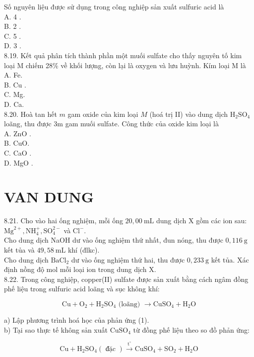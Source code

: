 \documentclass[10pt]{article}
\begin{document}
Số nguyên liệu được sử dụng trong công nghiệp sản xuất sulfuric acid là\\
A. 4 .\\
B. 2 .\\
C. 5 .\\
D. 3 .\\
8.19. Kết quả phân tích thành phần một muối sulfate cho thấy nguyên tố kim loại M chiếm 28\% về khối lượng, còn lại là oxygen và lưu huỳnh. Kím loại M là\\
A. Fe.\\
B. Cu .\\
C. Mg.\\
D. Ca.\\
8.20. Hoà tan hết $m$ gam oxide của kim loại $M$ (hoá trị II) vào dung dịch $\mathrm{H}_{2} \mathrm{SO}_{4}$ loãng, thu được 3m gam muối sulfate. Công thức của oxide kim loại là\\
A. ZnO .\\
B. CuO.\\
C. CaO .\\
D. MgO .

\section*{VAN DUNG}
8.21. Cho vào hai ống nghiệm, mỗi ống $20,00 \mathrm{~mL}$ dung dịch X gồm các ion sau: $\mathrm{Mg}^{2+}, \mathrm{NH}_{4}^{+}, \mathrm{SO}_{4}^{2-}$ và $\mathrm{Cl}^{-}$.\\
Cho dung dịch NaOH dư vào ống nghiệm thứ nhất, đun nóng, thu được $0,116 \mathrm{~g}$ kết tủa và $49,58 \mathrm{~mL}$ khí (đlkc).\\
Cho dung dịch $\mathrm{BaCl}_{2}$ dư vào ống nghiệm thứ hai, thu được $0,233 \mathrm{~g}$ kết tủa. Xác định nồng độ mol mỗi loại ion trong dung dịch X.\\
8.22. Trong công nghiệp, copper(II) sulfate được sản xuất bằng cách ngâm đồng phế liệu trong sulfuric acid loãng và sục không khí:


\begin{equation*}
\mathrm{Cu}+\mathrm{O}_{2}+\mathrm{H}_{2} \mathrm{SO}_{4} \text { (loãng) } \longrightarrow \mathrm{CuSO}_{4}+\mathrm{H}_{2} \mathrm{O} \tag{1}
\end{equation*}


a) Lập phương trình hoá học của phản ứng (1).\\
b) Tại sao thực tế không sản xuất $\mathrm{CuSO}_{4}$ từ đồng phế liệu theo so đồ phản ứng:


\begin{equation*}
\mathrm{Cu}+\mathrm{H}_{2} \mathrm{SO}_{4}(\text { đặc }) \xrightarrow{\mathrm{t}^{\circ}} \mathrm{CuSO}_{4}+\mathrm{SO}_{2}+\mathrm{H}_{2} \mathrm{O} \tag{2}
\end{equation*}
\end{document}
